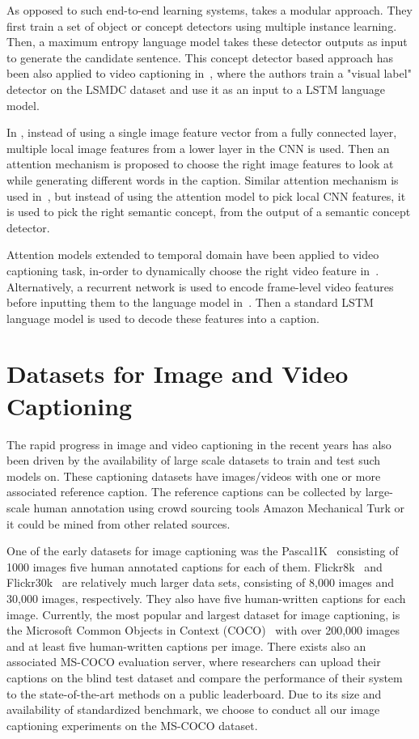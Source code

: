 As opposed to such end-to-end learning systems, \cite{Fang2015} takes a modular
approach. 
They first train a set of object or concept detectors using multiple instance
learning. 
Then, a maximum entropy language model takes these detector outputs as input to
generate the candidate sentence.
This concept detector based approach has been also applied to video captioning
in~\cite{DBLP:journals/corr/RohrbachTRTPLCS16}, where the authors train a
"visual label" detector on the LSMDC dataset and use it as an input to a LSTM
language model.

In \cite{Xu2015show}, instead of using a single image feature vector from a
fully connected layer, multiple local image features from a lower layer in the
CNN is used.
Then an attention mechanism is proposed to choose the right image features to
look at while generating different words in the caption.
Similar attention mechanism is used in~\cite{you2016image}, but instead of using
the attention model to pick local CNN features, it is used to pick the right
semantic concept, from the output of a semantic concept detector.

Attention models extended to temporal domain have been applied to video
captioning task, in-order to dynamically choose the right video feature
in~\cite{yao2015describing}.
%
Alternatively, a recurrent network is used to encode frame-level video features
before inputting them to the language model in~\cite{venugopalan2015sequence}.
Then a standard LSTM language model is used to decode these features into a
caption.
\section{Datasets for Image and Video Captioning}
The rapid progress in image and video captioning in the recent years has also been
driven by the availability of large scale datasets to train and test such models
on. 
These captioning datasets have images/videos with one or more associated
reference caption.
The reference captions can be collected by large-scale human annotation using
crowd sourcing tools Amazon Mechanical Turk or it could be mined from other
related sources. 

One of the early datasets for image captioning was the
Pascal1K~\cite{Rashtchian2010} consisting of 1000 images five human annotated
captions for each of them.
Flickr8k~\cite{Hodosh2013} and Flickr30k~\cite{Young2014} are relatively much
larger data sets, consisting of 8,000 images and 30,000 images, respectively. 
They also have five human-written captions for each image.
Currently, the most popular and largest dataset for image captioning, is the
Microsoft Common Objects in Context (COCO)~\cite{Lin2014} with over 200,000
images and at least five human-written captions per image.
There exists also an associated MS-COCO evaluation server, where researchers can
upload their captions on the blind test dataset and compare the performance of
their system to the state-of-the-art methods on a public leaderboard.
Due to its size and availability of standardized benchmark, we choose to conduct
all our image captioning experiments on the MS-COCO dataset. 

